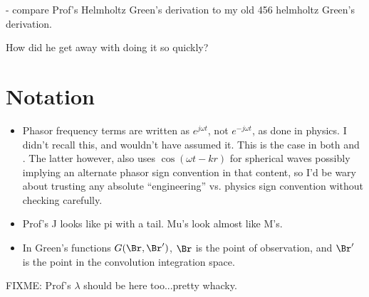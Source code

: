 - compare Prof's Helmholtz Green's derivation to my old 456 helmholtz Green's derivation.

How did he get away with doing it so quickly?

\section{Notation}

\begin{itemize}
\item Phasor frequency terms are written as \( e^{j \omega t} \), not \( e^{-j \omega t} \), as done in physics.  I didn't recall this, and wouldn't have assumed it.  This is the case in both \citep{jackson1975cew:simpleRadiating} and \citep{griffiths1999introduction:waves}.  The latter however, also uses \( \cos(\omega t - k r) \) for spherical waves possibly implying an alternate phasor sign convention in that content, so I'd be wary about trusting any absolute ``engineering'' vs. physics sign convention without checking carefully.
\item Prof's J looks like pi with a tail.  Mu's look almost like M's.
\item In Green's functions \( G(\Br, \Br') \), \( \Br \) is the point of observation, and \( \Br' \) is the point in the convolution integration space.
\end{itemize}
FIXME: Prof's \( \lambda \) should be here too...pretty whacky.

%
%

\EndArticle
